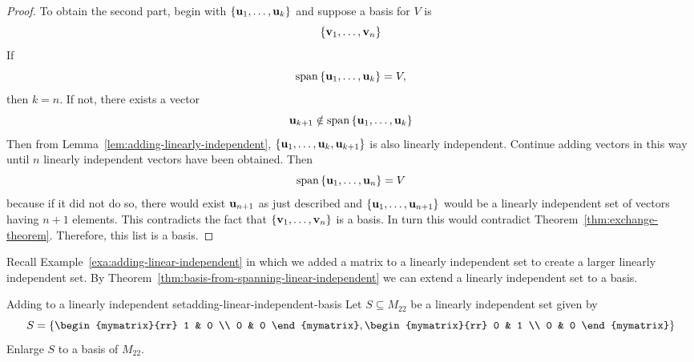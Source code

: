 \begin{proof}
  To obtain the second part, begin with $\left\{\mbox{\bf u}_{1},\ldots,\mbox{\bf u}
    _{k}\right\}$ and suppose a basis for $V$ is
  \begin{equation*}
    \left\{\mbox{\bf v}_{1},\ldots,\mbox{\bf v}_{n}\right\}
  \end{equation*}
  If
  \begin{equation*}
    \sspan\set{\vect{u}_{1},\ldots,\vect{u}_{k}} =V,
  \end{equation*}
  then $k=n$. If not, there exists a vector
  \begin{equation*}
    \vect{u}_{k+1}\notin \sspan\set{\vect{u}_{1},\ldots,\vect{u}
      _{k}}
  \end{equation*}
  Then from Lemma~\ref{lem:adding-linearly-independent},
  $\left\{\mbox{\bf u}_{1},\ldots,\mbox{\bf u}_{k}, \mbox{\bf u}_{k+1}\right\}$ is also
  linearly independent. Continue adding vectors in this way until $n$
  linearly independent vectors have been obtained. Then
  \begin{equation*}
    \sspan\set{\vect{u}_{1},\ldots,\vect{u}_{n}} =V
  \end{equation*}
  because if it did not do so, there would exist $\mbox{\bf u}_{n+1}$ as
  just described and $\left\{\mbox{\bf u}_{1},\ldots,\mbox{\bf u}_{n+1}\right\} $ would
  be a linearly independent set of vectors having $n+1$ elements. This
  contradicts the fact that $\left\{\mbox{\bf v}_{1},\ldots,\mbox{\bf v}_{n}\right\} $
  is a basis.  In turn this would contradict
  Theorem~\ref{thm:exchange-theorem}. Therefore, this list is a basis.
\end{proof}

Recall Example~\ref{exa:adding-linear-independent} in which we added a
matrix to a linearly independent set to create a larger linearly
independent set. By
Theorem~\ref{thm:basis-from-spanning-linear-independent} we can extend
a linearly independent set to a basis.

\begin{example}{Adding to a linearly independent set}{adding-linear-independent-basis}
  Let $S \subseteq M_{22}$ be a linearly independent set given by
  \begin{equation*}
    S  = \set{\begin{mymatrix}{rr}
        1 & 0 \\
        0 & 0
      \end{mymatrix}, \begin{mymatrix}{rr}
        0 & 1 \\
        0 & 0
      \end{mymatrix} }
  \end{equation*}
  Enlarge $S$ to a basis of $M_{22}$.
\end{example}

